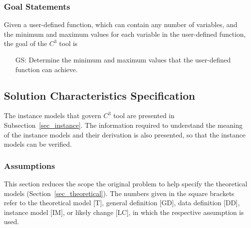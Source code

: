 \documentclass[12pt]{article}
\newcounter{goalnum} %
\newcommand{\prognameAbbrv}{$C^{3}$}
\begin{document}
\subsubsection{Goal Statements}

\noindent Given a user-defined function, which can contain any number of 
variables, and the minimum and maximum values for each variable in the 
user-defined function, the goal of the \prognameAbbrv{} tool is

\begin{itemize}

\item[GS\refstepcounter{goalnum}\thegoalnum \label{G_range}:] Determine the 
minimum and maximum values that the user-defined function can achieve.


\end{itemize}

\subsection{Solution Characteristics Specification}
The instance models that govern \prognameAbbrv{} tool are presented in
Subsection~\ref{sec_instance}. The information required to understand the 
meaning of the instance models and their derivation is also presented, so that 
the instance models can be verified.

\subsubsection{Assumptions}
This section reduces the scope the original problem to help specify the 
theoretical models (Section~\ref{sec_theoretical}). The numbers given in the 
square brackets refer to the theoretical model [T], general definition [GD], 
data definition [DD], instance model [IM], or likely change [LC], in which the 
respective assumption is used.
\end{document}
